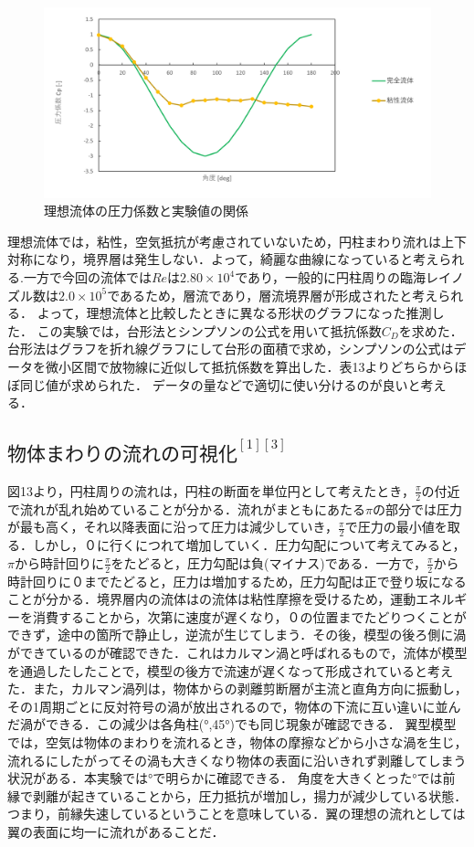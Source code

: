 \documentclass[a4paper,titlepage]{ltjsarticle}
\begin{document}
\begin{figure}[hbtp]
  \centering
  \includegraphics[width=13cm]{圧力係数と角度.png}
  \caption{理想流体の圧力係数と実験値の関係}
  \label{cp}
\end{figure}
理想流体では，粘性，空気抵抗が考慮されていないため，円柱まわり流れは上下対称になり，境界層は発生しない．よって，綺麗な曲線になっていると考えられる.一方で今回の流体では$Re$は$2.80\times10^4$であり，一般的に円柱周りの臨海レイノズル数は$2.0\times10^5$であるため，層流であり，層流境界層が形成されたと考えられる．
よって，理想流体と比較したときに異なる形状のグラフになった推測した．
この実験では，台形法とシンプソンの公式を用いて抵抗係数$C_D$を求めた．台形法はグラフを折れ線グラフにして台形の面積で求め，シンプソンの公式はデータを微小区間で放物線に近似して抵抗係数を算出した．表13よりどちらからほぼ同じ値が求められた．
データの量などで適切に使い分けるのが良いと考える．


\subsection{$物体まわりの流れの可視化^{[1][3]}$}
 図13より，円柱周りの流れは，円柱の断面を単位円として考えたとき，$\frac{\pi}{2}$の付近で流れが乱れ始めていることが分かる．流れがまともにあたる$\pi$の部分では圧力が最も高く，それ以降表面に沿って圧力は減少していき，$\frac{\pi}{2}$で圧力の最小値を取る．しかし，０に行くにつれて増加していく．圧力勾配について考えてみると，$\pi$から時計回りに$\frac{\pi}{2}$をたどると，圧力勾配は負(マイナス)である．一方で，$\frac{\pi}{2}$から時計回りに０までたどると，圧力は増加するため，圧力勾配は正で登り坂になることが分かる．境界層内の流体はの流体は粘性摩擦を受けるため，運動エネルギーを消費することから，次第に速度が遅くなり，０の位置までたどりつくことができず，途中の箇所で静止し，逆流が生じてしまう．その後，模型の後ろ側に渦ができているのが確認できた．これはカルマン渦と呼ばれるもので，流体が模型を通過したしたことで，模型の後方で流速が遅くなって形成されていると考えた．また，カルマン渦列は，物体からの剥離剪断層が主流と直角方向に振動し，その1周期ごとに反対符号の渦が放出されるので，物体の下流に互い違いに並んだ渦ができる．この減少は各角柱(°,45°)でも同じ現象が確認できる．
 翼型模型では，空気は物体のまわりを流れるとき，物体の摩擦などから小さな渦を生じ，流れるにしたがってその渦も大きくなり物体の表面に沿いきれず剥離してしまう状況がある．本実験では°で明らかに確認できる．
 角度を大きくとった°では前縁で剥離が起きていることから，圧力抵抗が増加し，揚力が減少している状態．つまり，前縁失速しているということを意味している．翼の理想の流れとしては翼の表面に均一に流れがあることだ．
\end{document}
